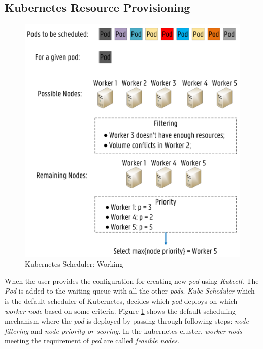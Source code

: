 \subsection{Kubernetes Resource Provisioning}
\label{sec:k8s_scheduler}
\begin{figure}
  \centering
  \includegraphics[width=\linewidth]{figures/mlcn-k8s-scheduler.pdf}
  \caption{Kubernetes Scheduler: Working\cite{Santos2019}}
  \label{fig:k8s-sch}
\end{figure}
When the user provides the configuration for creating new \emph{pod} using \emph{Kubectl}. The \emph{Pod} is added to the waiting queue with all the other \emph{pods}. \emph{Kube-Scheduler} which is the default scheduler of Kubernetes, decides which \emph{pod} deploys on which \emph{worker node} based on some criteria. Figure \ref{fig:k8s-sch} shows the default scheduling mechanism where the \emph{pod} is deployed by passing through following steps: \emph{node filtering} and \emph{node priority or scoring}\cite{Santos2019}. In the kubernetes cluster, \emph{worker nods} meeting the requirement of \emph{ped} are called \emph{feasible nodes}\cite{k8s}.
